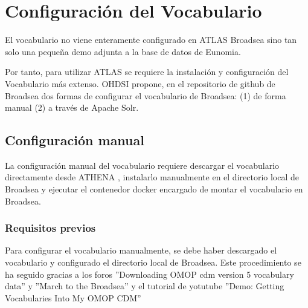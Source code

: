 \chapter{Configuración del Vocabulario} \label{cap:05Vocab}

El vocabulario no viene enteramente configurado en ATLAS Broadsea sino tan solo una pequeña demo adjunta a la base de datos de Eunomia.

Por tanto, para utilizar ATLAS se requiere la instalación y configuración del Vocabulario más extenso. OHDSI propone, en el repositorio de github de Broadsea \parencite{githubBroadsea} dos formas de configurar el vocabulario de Broadsea: (1) de forma manual (2) a través de Apache Solr. 

\section{Configuración manual} \label{sec:05ConfigManual}

La configuración manual del vocabulario requiere descargar el vocabulario directamente desde ATHENA \parencite{athena}, instalarlo manualmente en el directorio local de Broadsea y ejecutar el contenedor docker encargado de montar el vocabulario en Broadsea. 

\subsection{Requisitos previos} \label{subsec:05requisitos}

Para configurar el vocabulario manualmente,  se debe haber descargado el vocabulario y configurado el directorio local de Broadsea. Este procedimiento se ha seguido gracias a los foros ''Downloading OMOP cdm version 5 vocabulary data'' \parencite{forumCDMdownload} y ''March to the Broadsea'' \parencite{forumMarchBroadsea} y el tutorial de yotutube ''Demo: Getting Vocabularies Into My OMOP CDM'' \parencite{youtubeVocab}

